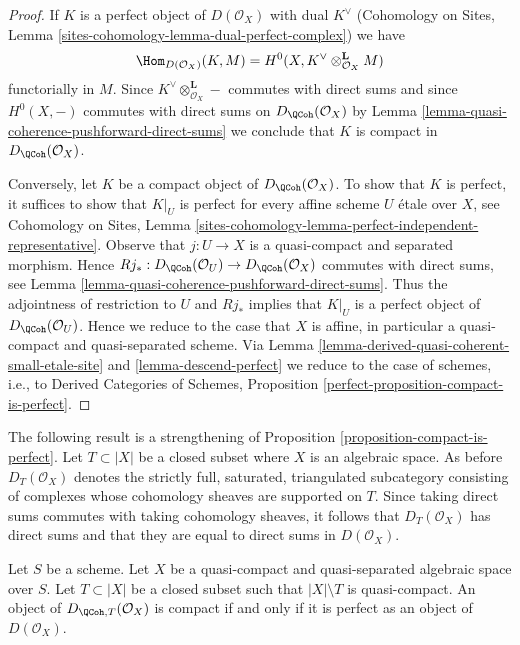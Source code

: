 \begin{proof}
If $K$ is a perfect object of $D(\mathcal{O}_X)$ with dual
$K^\vee$ (Cohomology on Sites, Lemma
\ref{sites-cohomology-lemma-dual-perfect-complex})
we have
$$
\Hom_{D(\mathcal{O}_X)}(K, M) =
H^0(X, K^\vee \otimes_{\mathcal{O}_X}^\mathbf{L} M)
$$
functorially in $M$. Since $K^\vee \otimes_{\mathcal{O}_X}^\mathbf{L} -$
commutes with direct sums and since $H^0(X, -)$ commutes with direct
sums on $D_\QCoh(\mathcal{O}_X)$ by
Lemma \ref{lemma-quasi-coherence-pushforward-direct-sums}
we conclude that $K$ is compact in $D_\QCoh(\mathcal{O}_X)$.

\medskip\noindent
Conversely, let $K$ be a compact object of $D_\QCoh(\mathcal{O}_X)$.
To show that $K$ is perfect, it suffices to show that
$K|_U$ is perfect for every affine scheme $U$ \'etale over $X$, see
Cohomology on Sites, Lemma
\ref{sites-cohomology-lemma-perfect-independent-representative}.
Observe that $j : U \to X$ is a quasi-compact and separated morphism.
Hence
$Rj_* : D_\QCoh(\mathcal{O}_U) \to D_\QCoh(\mathcal{O}_X)$
commutes with direct sums, see
Lemma \ref{lemma-quasi-coherence-pushforward-direct-sums}.
Thus the adjointness of restriction to $U$ and $Rj_*$ implies that
$K|_U$ is a perfect object of $D_\QCoh(\mathcal{O}_U)$.
Hence we reduce to the case that $X$ is affine, in particular a
quasi-compact and quasi-separated scheme. Via
Lemma \ref{lemma-derived-quasi-coherent-small-etale-site} and
\ref{lemma-descend-perfect}
we reduce to the case of schemes, i.e., to
Derived Categories of Schemes, Proposition
\ref{perfect-proposition-compact-is-perfect}.
\end{proof}

\noindent
The following result is a strengthening of
Proposition \ref{proposition-compact-is-perfect}.
Let $T \subset |X|$ be a closed subset where $X$ is an algebraic space.
As before $D_T(\mathcal{O}_X)$ denotes the strictly full, saturated,
triangulated subcategory consisting of complexes whose
cohomology sheaves are supported on $T$. Since taking direct
sums commutes with taking cohomology sheaves, it follows
that $D_T(\mathcal{O}_X)$ has direct sums and that they are equal
to direct sums in $D(\mathcal{O}_X)$.

\begin{lemma}
\label{lemma-compact-is-perfect-with-support}
Let $S$ be a scheme.
Let $X$ be a quasi-compact and quasi-separated algebraic space over $S$.
Let $T \subset |X|$ be a closed subset such that $|X| \setminus T$
is quasi-compact. An object of $D_{\QCoh, T}(\mathcal{O}_X)$ is compact
if and only if it is perfect as an object of $D(\mathcal{O}_X)$.
\end{lemma}

